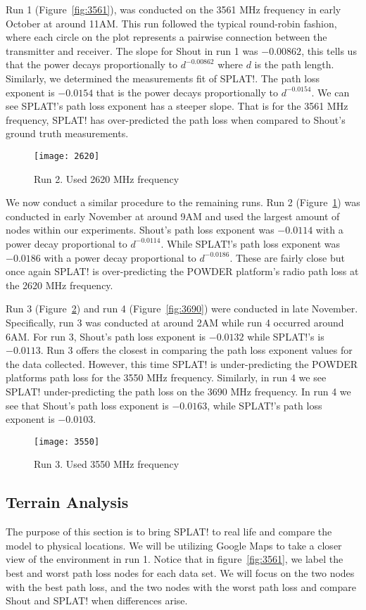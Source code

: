 Run 1 (Figure~\ref{fig:3561}), was conducted on the 3561 MHz frequency in early October at around 11AM. This run followed the typical round-robin fashion, 
where each circle on the plot represents a pairwise connection between the transmitter and receiver. The slope for Shout in run 1 was 
$-0.00862$, this tells us that the power decays proportionally to $d^{-0.00862}$ where $d$ is the path length. Similarly, we determined the
measurements fit of SPLAT!. The path loss exponent is $-0.0154$ that is the power decays proportionally to $d^{-0.0154}$. We can see 
SPLAT!'s path loss exponent has a steeper slope. That is for the 3561 MHz frequency, SPLAT! has over-predicted the path loss when 
compared to Shout's ground truth measurements. 

\begin{figure}
  \centering
  \texttt{[image: 2620]}
  \caption{Run 2. Used 2620 MHz frequency}
  \label{fig:2620}
\end{figure}

We now conduct a similar procedure to the remaining runs. Run 2 (Figure~\ref{fig:2620}) was conducted in early November at around 9AM and used the
largest amount of nodes within our experiments. Shout's path loss exponent was $-0.0114$ with a power decay proportional to $d^{-0.0114}$. 
While SPLAT!'s path loss exponent was $-0.0186$ with a power decay proportional to $d^{-0.0186}$. These are fairly close but once again
SPLAT! is over-predicting the POWDER platform's radio path loss at the 2620 MHz frequency. 

Run 3 (Figure~\ref{fig:3550}) and run 4 (Figure~\ref{fig:3690}) were conducted in late November. Specifically, run 3 was conducted at around
2AM while run 4 occurred around 6AM. For run 3, Shout's path loss exponent is $-0.0132$ while SPLAT!'s is $-0.0113$. Run 3 offers the 
closest in comparing the path loss exponent values for the data collected. However, this time SPLAT! is under-predicting the POWDER platforms
path loss for the 3550 MHz frequency. Similarly, in run 4 we see SPLAT! under-predicting the path loss on the 3690 MHz 
frequency. In run 4 we see that Shout's path loss exponent is $-0.0163$, while SPLAT!'s path loss exponent is $-0.0103$. 
 
 \begin{figure}
  \centering
  \texttt{[image: 3550]}
  \caption{Run 3. Used 3550 MHz frequency}
  \label{fig:3550}
\end{figure}

\subsection*{Terrain Analysis}
The purpose of this section is to bring SPLAT! to real life and compare the model to physical locations. We will be utilizing Google Maps
to take a closer view of the environment in run 1. Notice that in figure~\ref{fig:3561}, we label the best and worst path loss nodes for each
data set. We will focus on the two nodes with the best path loss, and the two nodes with the worst path loss and compare Shout and SPLAT!
when differences arise. 

